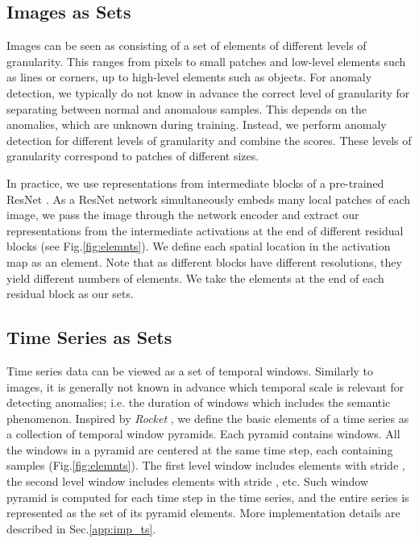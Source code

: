 \documentclass{article}
\begin{document}
\subsection{Images as Sets}
\label{subsec:images_sets}

Images can be seen as consisting of a set of elements of different levels of granularity. This ranges from pixels to small patches and low-level elements such as lines or corners, up to high-level elements such as objects. For anomaly detection, we typically do not know in advance the correct level of granularity for separating between normal and anomalous samples. This depends on the anomalies, which are unknown during training. Instead, we perform anomaly detection for different levels of granularity and combine the scores. These levels of granularity correspond to patches of different sizes. 

In practice, we use representations from intermediate blocks of a pre-trained ResNet \cite{he2016deep}. As a ResNet network simultaneously embeds many local patches of each image, we pass the image through the network encoder and extract our representations from the intermediate activations at the end of different residual blocks (see Fig.\ref{fig:elemnts}). We define each spatial location in the activation map as an element. Note that as different blocks have different resolutions, they yield different numbers of elements. We take the elements at the end of each residual block as our sets. 



\subsection{Time Series as Sets}
\label{subsec:timeseries_sets}

Time series data can be viewed as a set of temporal windows. Similarly to images, it is generally not known in advance which temporal scale is relevant for detecting anomalies; i.e. the duration of windows which includes the semantic phenomenon. Inspired by \textit{Rocket} \cite{dempster2020rocket}, we define the basic elements of a time series as a collection of temporal window pyramids. Each pyramid contains  windows. All the windows in a pyramid are  centered at the same time step, each containing  samples (Fig.\ref{fig:elemnts}). The first level window includes  elements with stride , the second level window includes  elements with stride , etc. Such window pyramid is computed for each time step in the time series, and the entire series is represented as the set of its pyramid elements. More implementation details are described in Sec.\ref{app:imp_ts}.
\end{document}
